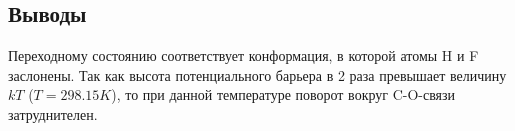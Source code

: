 \subsection{Выводы}
Переходному состоянию соответствует конформация, в которой атомы H и F заслонены. Так как высота потенциального барьера в 2 раза превышает величину $kT$ ($T = 298.15K$), то при данной температуре поворот вокруг C-O-связи затруднителен.

